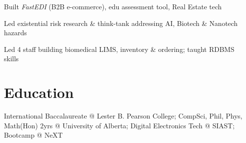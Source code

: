 \documentclass[line,margin,hidelinks]{res}
\begin{document}
\begin{resume}

\begin{position}
Built \textit{FastEDI} (B2B e-commerce),
edu assessment tool,
Real Estate tech
\end{position}


\begin{position}
Led existential risk research \& think-tank addressing AI, Biotech \& Nanotech hazards
\end{position}


\begin{position}
Led 4 staff building biomedical LIMS, inventory \& ordering;
taught RDBMS skills
\end{position}



\section{Education}
\begin{par}
International Baccalaureate @ Lester B. Pearson College; CompSci, Phil, Phys, Math(Hon) 2yrs @ University of Alberta; Digital Electronics Tech @ SIAST; Bootcamp @ NeXT
\end{par}

\end{resume}
\end{document}
